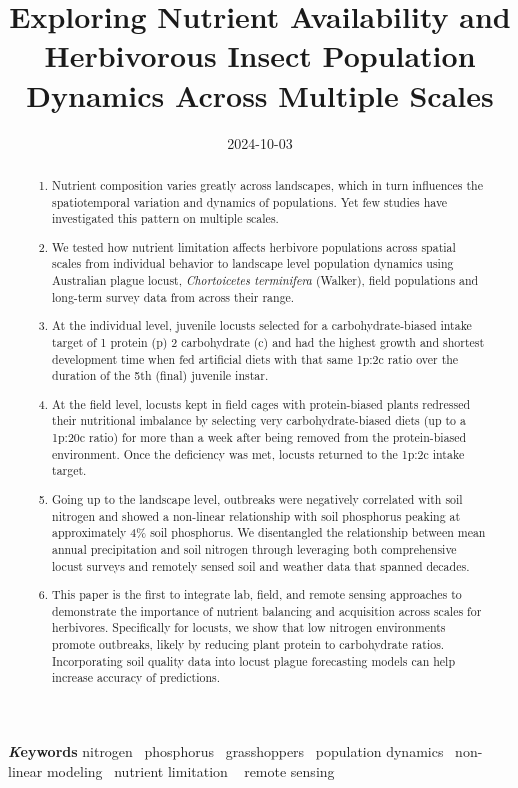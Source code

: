 \documentclass[
]{article}
\title{Exploring Nutrient Availability and Herbivorous Insect Population
Dynamics Across Multiple Scales}
\author{\asep\asep\asep\asep\asep\asep\asep\asep\asep}
\date{2024-10-03}
\begin{document}
\maketitle
\begin{abstract}
\begin{enumerate}
\def\labelenumi{\arabic{enumi}.}
\item
  Nutrient composition varies greatly across landscapes, which in turn
  influences the spatiotemporal variation and dynamics of populations.
  Yet few studies have investigated this pattern on multiple scales.
\item
  We tested how nutrient limitation affects herbivore populations across
  spatial scales from individual behavior to landscape level population
  dynamics using Australian plague locust, \emph{Chortoicetes
  terminifera} (Walker), field populations and long-term survey data
  from across their range.
\item
  At the individual level, juvenile locusts selected for a
  carbohydrate-biased intake target of 1 protein (p) 2 carbohydrate (c)
  and had the highest growth and shortest development time when fed
  artificial diets with that same 1p:2c ratio over the duration of the
  5th (final) juvenile instar.
\item
  At the field level, locusts kept in field cages with protein-biased
  plants redressed their nutritional imbalance by selecting very
  carbohydrate-biased diets (up to a 1p:20c ratio) for more than a week
  after being removed from the protein-biased environment. Once the
  deficiency was met, locusts returned to the 1p:2c intake target.
\item
  Going up to the landscape level, outbreaks were negatively correlated
  with soil nitrogen and showed a non-linear relationship with soil
  phosphorus peaking at approximately 4\% soil phosphorus. We
  disentangled the relationship between mean annual precipitation and
  soil nitrogen through leveraging both comprehensive locust surveys and
  remotely sensed soil and weather data that spanned decades.
\item
  This paper is the first to integrate lab, field, and remote sensing
  approaches to demonstrate the importance of nutrient balancing and
  acquisition across scales for herbivores. Specifically for locusts, we
  show that low nitrogen environments promote outbreaks, likely by
  reducing plant protein to carbohydrate ratios. Incorporating soil
  quality data into locust plague forecasting models can help increase
  accuracy of predictions.
\end{enumerate}
\end{abstract}
{\bfseries \emph Keywords}
\def\sep{\textbullet\ }
nitrogen \sep phosphorus \sep grasshoppers \sep population
dynamics \sep non-linear modeling \sep nutrient limitation \sep 
remote sensing
\end{document}
